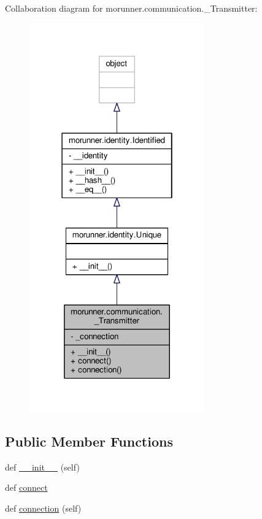 Collaboration diagram for morunner.\+communication.\+\_\+\+Transmitter\+:
\nopagebreak
\begin{figure}[H]
\begin{center}
\leavevmode
\includegraphics[width=214pt]{classmorunner_1_1communication_1_1__Transmitter__coll__graph}
\end{center}
\end{figure}
\subsection*{Public Member Functions}
\begin{DoxyCompactItemize}
\item 
def \hyperlink{classmorunner_1_1communication_1_1__Transmitter_ada6f89d3536ac6aeb6fe09fb3f5ac46e}{\+\_\+\+\_\+init\+\_\+\+\_\+} (self)
\item 
def \hyperlink{classmorunner_1_1communication_1_1__Transmitter_ad4e197abeee1bb81d41f57282ffb29c0}{connect}
\item 
def \hyperlink{classmorunner_1_1communication_1_1__Transmitter_a054317d3dbeecd42d6bbb81612d67ea5}{connection} (self)
\end{DoxyCompactItemize}
